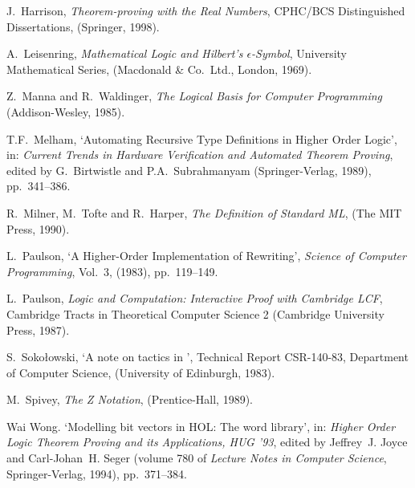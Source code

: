 \begin{thebibliography}{99}
J.\ Harrison,
{\it Theorem-proving with the Real Numbers},
{\rm CPHC/BCS Distinguished Dissertations},
(Springer, 1998).

A.\ Leisenring,
{\it Mathematical Logic and Hilbert's $\epsilon$-Symbol\/},
{\rm University Mathematical Series},
(Macdonald \& Co.\ Ltd., London, 1969).

Z.\ Manna and R.\ Waldinger,
{\it The Logical Basis for Computer Programming\/}
(Addison-Wesley, 1985).

T{}.F{}.\ Melham, `{}Automating Recursive Type Definitions
in Higher Order Logic',
in: {\it Current Trends in Hardware Verification and
Automated Theorem Proving\/}, edited by G.\ Birtwistle
and P.A.\ Subrahmanyam
(Springer-Verlag, 1989), pp.\ 341--386.

R.\ Milner, M.\ Tofte and R.\ Harper,
{\it The Definition of Standard ML\/},
(The MIT Press, 1990).

L.\ Paulson,
`{}A Higher-Order Implementation of Rewriting',
{\it Science of Computer Programming}, Vol.\ 3, (1983), pp.\ 119--149.

 L.\ Paulson,
{\it Logic and Computation: Interactive Proof with Cambridge LCF},
Cambridge Tracts in Theoretical Computer Science 2
(Cambridge University Press, 1987).

%
S.\ Soko\l owski, `{}A note on tactics in \LCF',
Technical Report CSR-140-83, Department of Computer Science,
(University of Edinburgh, 1983).


M.\ Spivey,
{\it The Z Notation}, (Prentice-Hall, 1989).

Wai Wong.
`Modelling bit vectors in {HOL}: The word library',
in: {\em Higher
  Order Logic Theorem Proving and its Applications, {HUG} '93}, edited
by Jeffrey~J. Joyce and Carl-Johan~H. Seger (volume 780 of
  {\em Lecture Notes in Computer Science}, Springer-Verlag, 1994),
  pp.~371--384.


\end{thebibliography}



